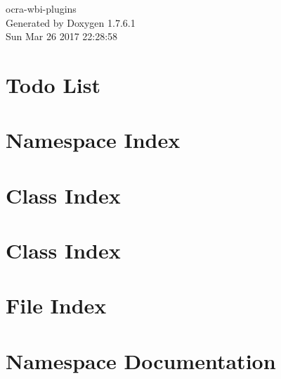 \documentclass[a4paper]{book}
\begin{document}
\hypersetup{pageanchor=false,citecolor=blue}
\begin{titlepage}
\vspace*{7cm}
\begin{center}
{\Large ocra-\/wbi-\/plugins }\\
\vspace*{1cm}
{\large \-Generated by Doxygen 1.7.6.1}\\
\vspace*{0.5cm}
{\small Sun Mar 26 2017 22:28:58}\\
\end{center}
\end{titlepage}
\clearemptydoublepage
{}
\tableofcontents
\clearemptydoublepage
{}
\hypersetup{pageanchor=true,citecolor=blue}
\chapter{\-Todo \-List}
\label{todo}
\hypertarget{todo}{}

\chapter{\-Namespace \-Index}

\chapter{\-Class \-Index}

\chapter{\-Class \-Index}

\chapter{\-File \-Index}

\chapter{\-Namespace \-Documentation}


\end{document}

